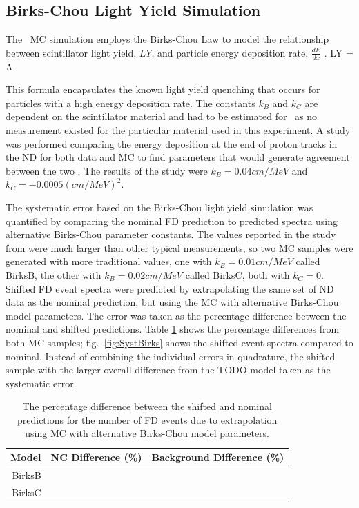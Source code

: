 \subsection{Birks-Chou Light Yield Simulation}

The \nova~MC simulation employs the Birks-Chou Law to model the relationship between scintillator light yield, $LY$, and particle energy deposition rate, $\frac{dE}{dx}$ \cite{ref:BirksChou}. 
\beq
LY = A  
\label{eq:BirksChou}
\eeq

\n This formula encapsulates the known light yield quenching that occurs for particles with a high energy deposition rate. The constants $k_B$ and $k_C$ are dependent on the scintillator material and had to be estimated for \nova~as no measurement existed for the particular material used in this experiment. A study was performed comparing the energy deposition at the end of proton tracks in the ND for both data and MC to find parameters that would generate agreement between the two \cite{ref:DanBirks}. The results of the study were $k_B = 0.04\unit{cm/MeV}$ and $k_C = -0.0005\unit{(cm/MeV)}^2$.

The systematic error based on the Birks-Chou light yield simulation was quantified by comparing the nominal FD prediction to predicted spectra using alternative Birks-Chou parameter constants. The values reported in the study from \cite{ref:DanBirks} were much larger than other typical measurements, so two MC samples were generated with more traditional values, one with $k_B = 0.01\unit{cm/MeV}$ called BirksB, the other with $k_B = 0.02\unit{cm/MeV}$ called BirksC, both with $k_C = 0$. Shifted FD event spectra were predicted by extrapolating the same set of ND data as the nominal prediction, but using the MC with alternative Birks-Chou model parameters. The error was taken as the percentage difference between the nominal and shifted predictions. Table \ref{tab:SystBirks} shows the percentage differences from both MC samples; fig.~\ref{fig:SystBirks} shows the shifted event spectra compared to nominal. Instead of combining the individual errors in quadrature, the shifted sample with the larger overall difference from the TODO model taken as the systematic error.
\begin{table}[h]
  \begin{center}
    \caption[Birks-Chou Systematic Errors]{The percentage difference between the shifted and nominal predictions for the number of FD events due to extrapolation using MC with alternative Birks-Chou model parameters.}
    \label{tab:SystBirks}
    \begin{tabular}{r c c}
      \hline\hline
      Model & NC Difference (\%) & Background Difference (\%) \\
      \hline
      BirksB & & \\
      BirksC & & \\
      \hline
    \end{tabular}
  \end{center}
\end{table}

